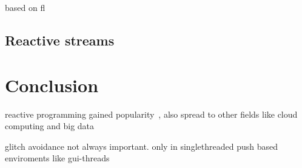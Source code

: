\documentclass[acmsmall]{acmart}\settopmatter{printfolios=true,printccs=false,printacmref=false}
\begin{document}
		based on fl

	\subsection{Reactive streams}

\section{Conclusion}


reactive programming gained popularity~\cite{reactiveManifesto2014}, also spread to other fields like cloud computing and big data \cite{Salvaneschi:2015}

glitch avoidance not always important. only in singlethreaded push based enviroments like gui-threads



\end{document}
